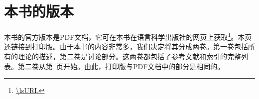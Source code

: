 
\section*{本书的版本}

本书的官方版本是PDF文档，它可在本书在语言科学出版社的网页上获取\footnote{
\url{\lsURL}
}。本页还链接到打印版。由于本书的内容非常多，我们决定将其分成两卷。第一卷包括所有的理论的描述，第二卷是讨论部分。这两卷都包括了参考文献和索引的完整列表。第二卷从第~\pageref{part-discussion}页开始。由此，打印版与PDF文档中的部分是相同的。







